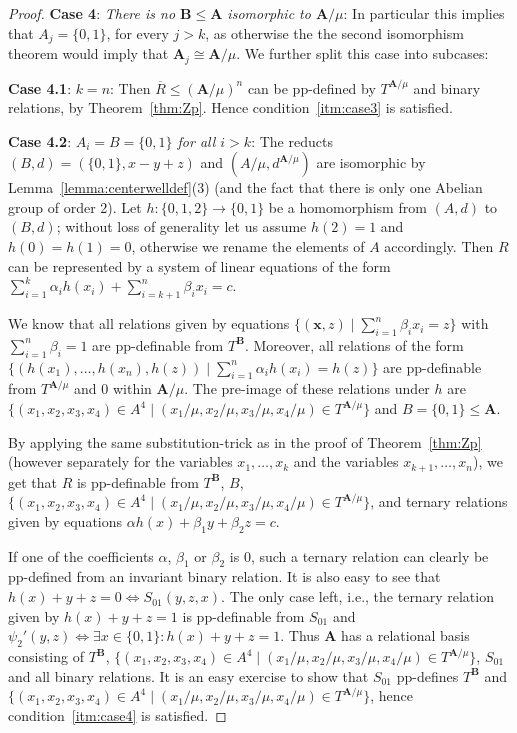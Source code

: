 \documentclass[12pt]{amsart}
\theoremstyle{definition}
\theoremstyle{definition}
\newcommand{\alg}[1]{\mathbf{#1}}
\newcommand{\algA}{\alg{A}}
\newcommand{\algB}{\alg{B}}
\begin{document}
\begin{proof}
\textbf{Case 4}: \textit{There is no $\alg{B}\leq\alg{A}$ isomorphic to $\algA/\mu$}:
In particular this implies that $A_j = \{0,1\}$, for every $j>k$,
as otherwise the the second isomorphism theorem
would imply that $\algA_j \cong \algA/\mu$. 
We further split this case into subcases:

\textbf{Case 4.1}: \textit{$k=n$}:
Then $\overline R \leq (\alg{A}/\mu)^n$ can be pp-defined by $T^{\alg{A}/\mu}$ and binary relations, by Theorem~\ref{thm:Zp}. Hence condition~\eqref{itm:case3} is satisfied. 

\textbf{Case 4.2}: \textit{$A_i = B = \{0,1\}$ for all $i>k$}:
The reducts $(B,d) = (\{0,1\},x-y+z)$ and $(A/\mu,d^{\alg{A}/\mu})$ are isomorphic by Lemma~\ref{lemma:centerwelldef}(3) (and the fact that there is only one Abelian group of order 2).
Let $h \colon \{0,1,2\} \to \{0,1\}$ be a homomorphism from $(A,d)$ to $(B,d)$; without loss of generality let us assume $h(2) =1$ and $h(0)=h(1)=0$, otherwise we rename the elements of $A$ accordingly. Then $R$ can be represented by a system of linear equations of the form $\sum_{i=1}^k \alpha_i h(x_i) + \sum_{i=k+1}^n \beta_i x_i = c$.

We know that all relations given by equations $\{(\boldsymbol{x},z) \mid \sum_{i=1}^n \beta_i x_i = z\}$ with $\sum_{i=1}^n \beta_i = 1$ are pp-definable from $T^\algB$. Moreover, all relations of the form $\{(h(x_1),\ldots,h(x_n),h(z)) \mid \sum_{i=1}^n \alpha_i h(x_i) = h(z) \}$ are pp-definable from $T^{\alg{A}/\mu}$ and $0$ within $\algA/\mu$. The pre-image of these relations under $h$ are $\{(x_1,x_2,x_3,x_4) \in A^4 \mid (x_1/\mu,x_2/\mu,x_3/\mu,x_4/\mu) \in T^{\alg{A}/\mu}\}$ and $B = \{0,1\} \leq \algA$.
 
By applying the same substitution-trick as in the proof of Theorem~\ref{thm:Zp} (however separately for the variables $x_1,\ldots,x_k$ and the variables $x_{k+1},\ldots,x_n$), we get that $R$ is pp-definable from $T^\algB$, $B$, $\{(x_1,x_2,x_3,x_4) \in A^4 \mid (x_1/\mu,x_2/\mu,x_3/\mu,x_4/\mu) \in T^{\alg{A}/\mu}\}$, and ternary relations given by equations $\alpha h(x) + \beta_1y +\beta_2z = c$.

If one of the coefficients $\alpha$, $\beta_1$ or $\beta_2$ is $0$, such a ternary relation can clearly be pp-defined from an invariant binary relation. It is also easy to see that $h(x) +y+z = 0 \Leftrightarrow S_{01}(y,z,x)$. The only case left, i.e., the ternary relation given by $h(x) + y+z= 1$ is pp-definable from $S_{01}$ and $\psi_2'(y,z) \Leftrightarrow \exists x \in \{0,1\} \colon h(x)+ y + z = 1$. Thus $\alg{A}$ has a relational basis consisting of $T^\algB$, $\{(x_1,x_2,x_3,x_4) \in A^4 \mid (x_1/\mu,x_2/\mu,x_3/\mu,x_4/\mu) \in T^{\alg{A}/\mu}\}$, $S_{01}$ and all binary relations. It is an easy exercise to show that $S_{01}$ pp-defines $T^\algB$ and $\{(x_1,x_2,x_3,x_4) \in A^4 \mid (x_1/\mu,x_2/\mu,x_3/\mu,x_4/\mu) \in T^{\alg{A}/\mu}\}$, hence condition~\eqref{itm:case4} is satisfied.
\end{proof}
\end{document}
